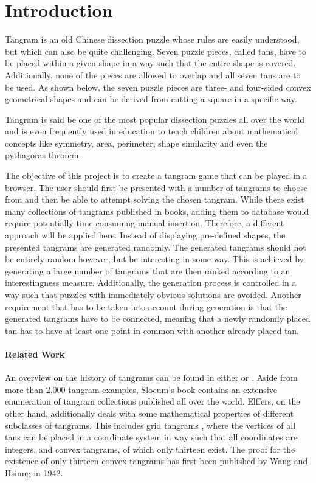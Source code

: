 \chapter{Introduction}\label{chapter:introduction}

Tangram is an old Chinese dissection puzzle whose rules are easily understood, but which can also be quite challenging. Seven puzzle pieces, called tans, have to be placed within a given shape in a way such that the entire shape is covered. Additionally, none of the pieces are allowed to overlap and all seven tans are to be used. As shown below, the seven puzzle pieces are three- and four-sided convex geometrical shapes and can be derived from cutting a square in a specific way.  



Tangram is said be one of the most popular dissection puzzles all over the world and is even frequently used in education to teach children about mathematical concepts like symmetry, area, perimeter, shape similarity and even the pythagoras theorem. 

The objective of this project is to create a tangram game that can be played in a browser. The user should first be presented with a number of tangrams to choose from and then be able to attempt solving the chosen tangram. 
While there exist many collections of tangrams published in books, adding them to database would require potentially time-consuming manual insertion. Therefore, a different approach will be applied here. Instead of displaying pre-defined shapes, the presented tangrams are generated randomly. The generated tangrams should not be entirely random however, but be interesting in some way. This is achieved by generating a large number of tangrams that are then ranked according to an interestingness measure. Additionally, the generation process is controlled in a way such that puzzles with immediately obvious solutions are avoided. Another requirement that has to be taken into account during generation is that the generated tangrams have to be connected, meaning that a newly randomly placed tan has to have at least one point in common with another already placed tan. 

\subsubsection*{Related Work}

An overview on the history of tangrams can be found in either \cite{slocum03} or \cite{elffers76}. Aside from more than 2,000 tangram examples, Slocum's book contains an extensive enumeration of tangram collections published all over the world. Elffers, on the other hand, additionally deals with some mathematical properties of different subclasses of tangrams. This includes grid tangrams \cite{koeller99}, where the vertices of all tans can be placed in a coordinate system in way such that all coordinates are integers, and convex tangrams, of which only thirteen exist. The proof for the existence of only thirteen convex tangrams has first been published by Wang and Hsiung \cite{wang42} in 1942.

